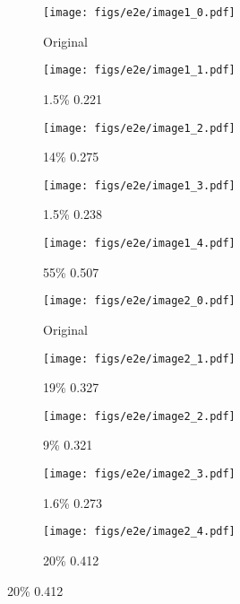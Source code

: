 \captionsetup[subfigure]{aboveskip=0pt, belowskip=1pt} %
\begin{figure}[t]
    \centering
    \begin{minipage}{0.06\textwidth}
        \centering
    \end{minipage}%
    \begin{subfigure}[b]{0.075\textwidth}
        \texttt{[image: figs/e2e/image1\_0.pdf]}
        \caption*{\scriptsize Original}
    \end{subfigure}
    \begin{subfigure}[b]{0.075\textwidth}
        \texttt{[image: figs/e2e/image1\_1.pdf]}
        \caption*{\scriptsize 1.5\% 0.221}
    \end{subfigure}
    \begin{subfigure}[b]{0.075\textwidth}
        \texttt{[image: figs/e2e/image1\_2.pdf]}
        \caption*{\scriptsize 14\% 0.275}
    \end{subfigure}
        \begin{subfigure}[b]{0.075\textwidth}
        \texttt{[image: figs/e2e/image1\_3.pdf]}
        \caption*{\scriptsize 1.5\% 0.238}
    \end{subfigure}
        \begin{subfigure}[b]{0.075\textwidth}
        \texttt{[image: figs/e2e/image1\_4.pdf]}
        \caption*{\scriptsize 55\% 0.507}
    \end{subfigure}


    \vspace{-2.7em}
    \begin{minipage}{0.06\textwidth}
        \centering
    \end{minipage}%
    \begin{subfigure}[b]{0.075\textwidth}
        \texttt{[image: figs/e2e/image2\_0.pdf]}
        \caption*{\scriptsize Original}
    \end{subfigure}
    \begin{subfigure}[b]{0.075\textwidth}
        \texttt{[image: figs/e2e/image2\_1.pdf]}
        \caption*{\scriptsize 19\% 0.327}
    \end{subfigure}
    \begin{subfigure}[b]{0.075\textwidth}
        \texttt{[image: figs/e2e/image2\_2.pdf]}
        \caption*{\scriptsize 9\% 0.321}
    \end{subfigure}
        \begin{subfigure}[b]{0.075\textwidth}
        \texttt{[image: figs/e2e/image2\_3.pdf]}
        \caption*{\scriptsize 1.6\% 0.273}
    \end{subfigure}
        \begin{subfigure}[b]{0.075\textwidth}
        \texttt{[image: figs/e2e/image2\_4.pdf]}
        \caption*{\scriptsize 20\% 0.412}
    \end{subfigure}


\end{figure}
